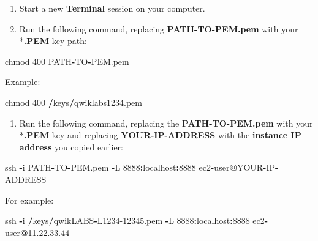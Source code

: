 \documentclass[]{book}
\newenvironment{Shaded}{\begin{snugshade}}{\end{snugshade}}
\newcommand{\DecValTok}[1]{\textcolor[rgb]{0.00,0.00,0.81}{#1}}
\newcommand{\FloatTok}[1]{\textcolor[rgb]{0.00,0.00,0.81}{#1}}
\newcommand{\OperatorTok}[1]{\textcolor[rgb]{0.81,0.36,0.00}{\textbf{#1}}}
\newcommand{\NormalTok}[1]{#1}
\providecommand{\tightlist}{%
  \setlength{\itemsep}{0pt}\setlength{\parskip}{0pt}}
\begin{document}
\begin{enumerate}
\def\labelenumi{\arabic{enumi}.}
\setcounter{enumi}{75}
\tightlist
\item
  Start a new \textbf{Terminal} session on your computer.
\item
  Run the following command, replacing \textbf{PATH-TO-PEM.pem} with your *\textbf{.PEM} key path:
\end{enumerate}

\begin{Shaded}
\begin{Highlighting}[]
\NormalTok{chmod }\DecValTok{400}\NormalTok{ PATH}\OperatorTok{-}\NormalTok{TO}\OperatorTok{-}\NormalTok{PEM.pem }
\end{Highlighting}
\end{Shaded}

Example:

\begin{Shaded}
\begin{Highlighting}[]
\NormalTok{chmod }\DecValTok{400} \OperatorTok{/}\NormalTok{keys}\OperatorTok{/}\NormalTok{qwiklabs1234.pem }
\end{Highlighting}
\end{Shaded}

\begin{enumerate}
\def\labelenumi{\arabic{enumi}.}
\setcounter{enumi}{77}
\tightlist
\item
  Run the following command, replacing the \textbf{PATH-TO-PEM.pem} with your *\textbf{.PEM} key and replacing \textbf{YOUR-IP-ADDRESS} with the \textbf{instance IP address} you copied earlier:
\end{enumerate}

\begin{Shaded}
\begin{Highlighting}[]
\NormalTok{ssh }\OperatorTok{-}\NormalTok{i PATH}\OperatorTok{-}\NormalTok{TO}\OperatorTok{-}\NormalTok{PEM.pem }\OperatorTok{-}\NormalTok{L }\DecValTok{8888}\OperatorTok{:}\NormalTok{localhost}\OperatorTok{:}\DecValTok{8888} 
\NormalTok{ec2}\OperatorTok{-}\NormalTok{user}\OperatorTok{@}\NormalTok{YOUR}\OperatorTok{-}\NormalTok{IP}\OperatorTok{-}\NormalTok{ADDRESS }
\end{Highlighting}
\end{Shaded}

For example:

\begin{Shaded}
\begin{Highlighting}[]
\NormalTok{ssh }\OperatorTok{-}\NormalTok{i }\OperatorTok{/}\NormalTok{keys}\OperatorTok{/}\NormalTok{qwikLABS}\OperatorTok{-}\NormalTok{L1234}\FloatTok{-12345.}\NormalTok{pem }\OperatorTok{-}\NormalTok{L }\DecValTok{8888}\OperatorTok{:}\NormalTok{localhost}\OperatorTok{:}\DecValTok{8888} 
\NormalTok{ec2}\OperatorTok{-}\NormalTok{user}\OperatorTok{@}\DecValTok{11}\NormalTok{.}\DecValTok{22}\NormalTok{.}\FloatTok{33.44}
\end{Highlighting}
\end{Shaded}
\end{document}
